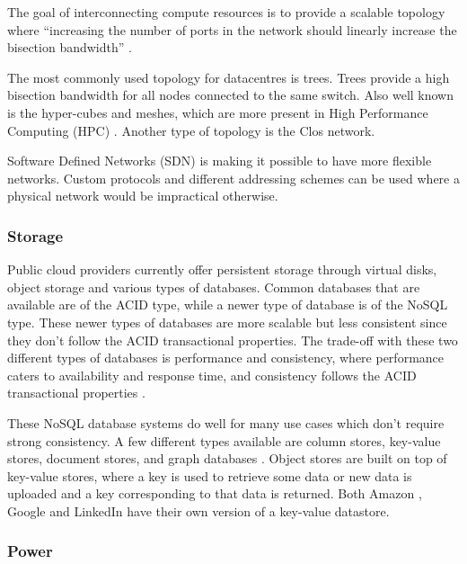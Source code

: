 \documentclass[fullapage,12pt]{article}
\begin{document}
The goal of interconnecting compute resources is to provide a scalable topology where ``increasing the number of ports in the network should linearly increase the bisection bandwidth'' \cite{abts2012guided}.

The most commonly used topology for datacentres is trees. Trees provide a high bisection bandwidth for all nodes connected to the same switch. Also well known is the hyper-cubes and meshes, which are more present in High Performance Computing (HPC) \cite{Jennings2015}. Another type of topology is the Clos network. %

Software Defined Networks (SDN) is making it possible to have more flexible networks. Custom protocols and different addressing schemes can be used where a physical network would be impractical otherwise.

\subsubsection{Storage} \label{ssub:storage}


Public cloud providers currently offer persistent storage through virtual disks, object storage and various types of databases. Common databases that are available are of the ACID type, while a newer type of database is of the NoSQL type. These newer types of databases are more scalable but less consistent since they don't follow the ACID transactional properties. The trade-off with these two different types of databases is performance and consistency, where performance caters to availability and response time, and consistency follows the ACID transactional properties \cite{Jennings2015}.

These NoSQL database systems do well for many use cases which don't require strong consistency. A few different types available are column stores, key-value stores, document stores, and graph databases \cite{graphDB2013}. Object stores are built on top of key-value stores, where a key is used to retrieve some data or new data is uploaded and a key corresponding to that data is returned. Both Amazon \cite{dynamodb}, Google \cite{cassandra} and LinkedIn \cite{voldemort} have their own version of a key-value datastore.


\subsubsection{Power} \label{ssub:power}
\end{document}
